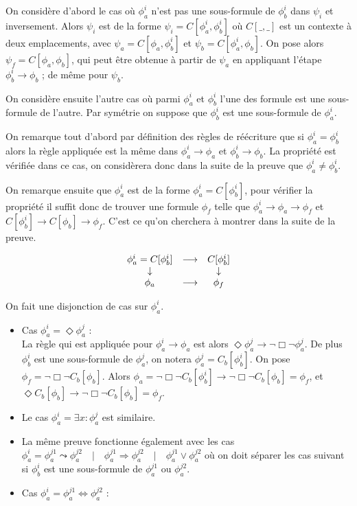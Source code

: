 \documentclass[12pt]{article}
\newcommand{\lra}{\ensuremath{\longrightarrow}}
\newcommand{\qbq}{\ensuremath{\quad | \quad}}
\begin{document}
\smallskip
On considère d'abord le cas où \( \phi_a^i \) n'est pas une sous-formule de \( \phi_b^i \) dans  \(\psi_i\) et inversement.
Alors \( \psi_i\) est de la forme \(\psi_i = C[\phi_a^i, \phi_b^i]\) où \(C[\_,\_]\) est un contexte à deux emplacements, avec \(\psi_a = C[\phi_a, \phi_b^i]\) et \(\psi_b = C[\phi_a^i, \phi_b]\).
On pose alors \(\psi_f = C[\phi_a, \phi_b]\), qui peut être obtenue à partir de \(\psi_a\) en appliquant l'étape \(\phi_b^i \longrightarrow \phi_b \) ; de même pour \(\psi_b\).


\smallskip
On considère ensuite l'autre cas où parmi \(\phi_a^i\) et \(\phi_b^i\) l'une des formule est une sous-formule de l'autre.
Par symétrie on suppose que \(\phi_b^i\) est une sous-formule de \(\phi_a^i\).

On remarque tout d'abord par définition des règles de réécriture que si \(\phi_a^i = \phi_b^i\) alors la règle appliquée est la même dans \(\phi_a^i \lra \phi_a\) et \(\phi_b^i \lra \phi_b\).
La propriété est vérifiée dans ce cas, on considèrera donc dans la suite de la preuve que \(\phi_a^i \neq \phi_b^i\).

On remarque ensuite que \(\phi_a^i\) est de la forme \(\phi_a^i = C[\phi_b^i]\), pour vérifier la propriété il suffit donc de trouver une formule \(\phi_f\) telle que \(\phi_a^i \lra \phi_a \lra \phi_f\) et \(C[\phi_b^i] \lra C[\phi_b] \lra \phi_f\). C'est ce qu'on cherchera à montrer dans la suite de la preuve.

\[ \begin{array}{c c c}
     \phi_a^i = C[\phi_b^i] & \lra & C[\phi_b^i] \\
     \downarrow & & \downarrow \\
     \phi_a & \lra & \phi_f
   \end{array} \]

On fait une disjonction de cas sur \(\phi_a^i\).

\begin{itemize}
\item Cas \(\phi_a^i = \Diamond \phi_a^j\) : \\
  La règle qui est appliquée pour \(\phi_a^i \lra \phi_a\) est alors \(\Diamond \phi_a^j \lra \neg \Box \neg \phi_a^j\).
  De plus \(\phi_b^i\) est une sous-formule de \(\phi_a^j\), on notera \(\phi_a^j = C_b[\phi_b^i]\).
  On pose \(\phi_f = \neg \Box \neg C_b[\phi_b]\).
  Alors \(\phi_a = \neg \Box \neg C_b[\phi_b^i] \lra \neg \Box \neg C_b[\phi_b] = \phi_f\), et \(\Diamond C_b[\phi_b] \lra \neg \Box \neg C_b[\phi_b] = \phi_f\).

\item Le {cas \(\phi_a^i = \exists x : \phi_a^j\)} est similaire.
\item La même preuve fonctionne également avec {les cas} \(\phi_a^i =
  \phi_a^{j1} \leadsto \phi_a^{j2} \qbq
  \phi_a^{j1} \Rightarrow \phi_a^{j2} \qbq
  \phi_a^{j1} \lor \phi_a^{j2}\)
  où on doit séparer les cas suivant si \(\phi_b^i\) est une sous-formule de \(\phi_a^{j1}\) ou \(\phi_a^{j2}\).
\item Cas \(\phi_a^i = \phi_a^{j1} \Leftrightarrow \phi_a^{j2}\) : \\
\end{itemize}
\end{document}
